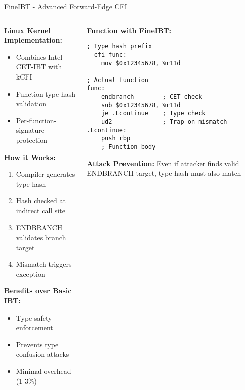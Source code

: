 \documentclass[aspectratio=169,12pt]{beamer}
\begin{document}
\begin{frame}[fragile]{FineIBT - Advanced Forward-Edge CFI}
    \begin{columns}
        \begin{column}{0.5\textwidth}
            \textbf{Linux Kernel Implementation:}
            \begin{itemize}
                \item Combines Intel CET-IBT with kCFI
                \item Function type hash validation
                \item Per-function-signature protection
            \end{itemize}
            
            \vspace{0.3cm}
            \textbf{How it Works:}
            \begin{enumerate}
                \item Compiler generates type hash
                \item Hash checked at indirect call site
                \item ENDBRANCH validates branch target
                \item Mismatch triggers exception
            \end{enumerate}
            
            \vspace{0.3cm}
            \textbf{Benefits over Basic IBT:}
            \begin{itemize}
                \item Type safety enforcement
                \item Prevents type confusion attacks
                \item Minimal overhead (1-3\%)
            \end{itemize}
        \end{column}
        \begin{column}{0.5\textwidth}
            \begin{tcolorbox}[colback=gray!10]
                \small
                \textbf{Function with FineIBT:}
                \begin{verbatim}
; Type hash prefix
__cfi_func:
    mov $0x12345678, %r11d
    
; Actual function
func:
    endbranch        ; CET check
    sub $0x12345678, %r11d
    je .Lcontinue    ; Type check
    ud2              ; Trap on mismatch
.Lcontinue:
    push rbp
    ; Function body
                \end{verbatim}
            \end{tcolorbox}
            
            \begin{tcolorbox}[colback=yellow!10]
                \small
                \textbf{Attack Prevention:}
                Even if attacker finds valid ENDBRANCH target, type hash must also match
            \end{tcolorbox}
        \end{column}
    \end{columns}
\end{frame}
\end{document}
